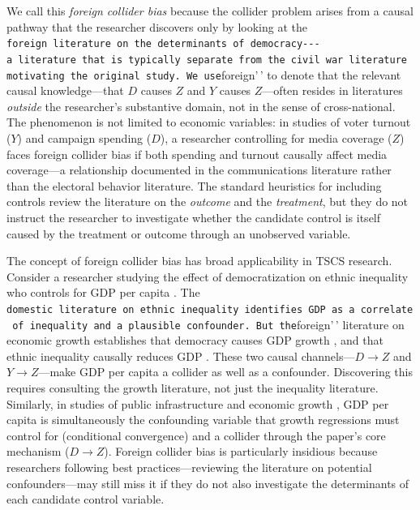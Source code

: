 \documentclass[
]{article}
\begin{document}
We call this \textit{foreign collider bias} because the collider problem
arises from a causal pathway that the researcher discovers only by
looking at the
\texttt{foreign\textquotesingle{}\textquotesingle{}\ literature\ on\ the\ determinants\ of\ democracy-\/-\/-a\ literature\ that\ is\ typically\ separate\ from\ the\ civil\ war\ literature\ motivating\ the\ original\ study.\ We\ use}foreign'\,'
to denote that the relevant causal knowledge---that \(D\) causes \(Z\)
and \(Y\) causes \(Z\)---often resides in literatures \textit{outside}
the researcher's substantive domain, not in the sense of cross-national.
The phenomenon is not limited to economic variables: in studies of voter
turnout (\(Y\)) and campaign spending (\(D\)), a researcher controlling
for media coverage (\(Z\)) faces foreign collider bias if both spending
and turnout causally affect media coverage---a relationship documented
in the communications literature rather than the electoral behavior
literature. The standard heuristics for including controls review the
literature on the \textit{outcome} and the \textit{treatment}, but they
do not instruct the researcher to investigate whether the candidate
control is itself caused by the treatment or outcome through an
unobserved variable.

The concept of foreign collider bias has broad applicability in TSCS
research. Consider a researcher studying the effect of democratization
on ethnic inequality who controls for GDP per capita
\citep{leipziger2024}. The
\texttt{domestic\textquotesingle{}\textquotesingle{}\ literature\ on\ ethnic\ inequality\ identifies\ GDP\ as\ a\ correlate\ of\ inequality\ and\ a\ plausible\ confounder.\ But\ the}foreign'\,'
literature on economic growth establishes that democracy causes GDP
growth \citep{acemoglu_etal2019}, and that ethnic inequality causally
reduces GDP \citep{grundler_link2024}. These two causal
channels---\(D \to Z\) and \(Y \to Z\)---make GDP per capita a collider
as well as a confounder. Discovering this requires consulting the growth
literature, not just the inequality literature. Similarly, in studies of
public infrastructure and economic growth \citep{rogowski_etal2022}, GDP
per capita is simultaneously the confounding variable that growth
regressions must control for (conditional convergence) and a collider
through the paper's core mechanism (\(D \to Z\)). Foreign collider bias
is particularly insidious because researchers following best
practices---reviewing the literature on potential confounders---may
still miss it if they do not also investigate the determinants of each
candidate control variable.
\end{document}
